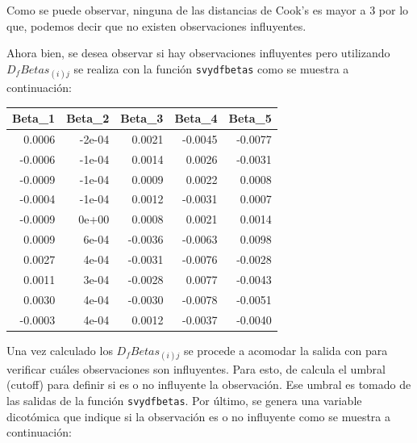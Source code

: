 \documentclass[
  12pt,
]{book}
\newenvironment{Shaded}{\begin{snugshade}}{\end{snugshade}}
\newcommand{\DataTypeTok}[1]{\textcolor[rgb]{0.13,0.29,0.53}{#1}}
\newcommand{\DecValTok}[1]{\textcolor[rgb]{0.00,0.00,0.81}{#1}}
\newcommand{\FunctionTok}[1]{\textcolor[rgb]{0.13,0.29,0.53}{\textbf{#1}}}
\newcommand{\NormalTok}[1]{#1}
\newcommand{\OtherTok}[1]{\textcolor[rgb]{0.56,0.35,0.01}{#1}}
\newcommand{\SpecialCharTok}[1]{\textcolor[rgb]{0.81,0.36,0.00}{\textbf{#1}}}
\newcommand{\StringTok}[1]{\textcolor[rgb]{0.31,0.60,0.02}{#1}}
\begin{document}
Como se puede observar, ninguna de las distancias de Cook's es mayor a 3 por lo que, podemos decir que no existen observaciones influyentes.

Ahora bien, se desea observar si hay observaciones influyentes pero utilizando \(D_{f}Betas_{\left(i\right)j}\) se realiza con la función \texttt{svydfbetas} como se muestra a continuación:

\begin{Shaded}
\end{Shaded}

\begin{tabular}{r|r|r|r|r}
\hline
Beta\_1 & Beta\_2 & Beta\_3 & Beta\_4 & Beta\_5\\
\hline
0.0006 & -2e-04 & 0.0021 & -0.0045 & -0.0077\\
\hline
-0.0006 & -1e-04 & 0.0014 & 0.0026 & -0.0031\\
\hline
-0.0009 & -1e-04 & 0.0009 & 0.0022 & 0.0008\\
\hline
-0.0004 & -1e-04 & 0.0012 & -0.0031 & 0.0007\\
\hline
-0.0009 & 0e+00 & 0.0008 & 0.0021 & 0.0014\\
\hline
0.0009 & 6e-04 & -0.0036 & -0.0063 & 0.0098\\
\hline
0.0027 & 4e-04 & -0.0031 & -0.0076 & -0.0028\\
\hline
0.0011 & 3e-04 & -0.0028 & 0.0077 & -0.0043\\
\hline
0.0030 & 4e-04 & -0.0030 & -0.0078 & -0.0051\\
\hline
-0.0003 & 4e-04 & 0.0012 & -0.0037 & -0.0040\\
\hline
\end{tabular}

Una vez calculado los \(D_{f}Betas_{\left(i\right)j}\) se procede a acomodar la salida con para verificar cuáles observaciones son influyentes. Para esto, de calcula el umbral (cutoff) para definir si es o no influyente la observación. Ese umbral es tomado de las salidas de la función \texttt{svydfbetas}. Por último, se genera una variable dicotómica que indique si la observación es o no influyente como se muestra a continuación:
\end{document}
